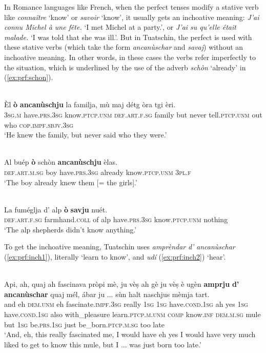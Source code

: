 In Romance languages like French, when the perfect tenses modify a stative verb like \textit{connaître} `know' or \textit{savoir} `know', it usually gets an inchoative meaning: \textit{J'ai connu Michel à une fête.} `I met Michel at a party.', or \textit{J'ai su qu'elle était malade.} `I was told that she was ill.'. But in Tuatschin, the perfect is used with these stative verbs (which take the form \textit{ancanùschar} and \textit{savaj}) without an inchoative meaning. In other words, in these cases the verbs refer imperfectly to the situation, which is underlined by the use of the adverb \textit{schòn} `already' in (\ref{ex:prf:schon}).

\ea\label{ex:prf:inch:1}
 {\citealt[139]{Büchli1966}}\\
\gll    Èl \textbf{ò} \textbf{ancanùschju} la familja, mù maj détg òra tgi èri. \\
     \textsc{3sg.m} have.\textsc{prs.3sg} know.\textsc{ptcp.unm} \textsc{def.art.f.sg} family but never tell.\textsc{ptcp.unm} out who \textsc{cop.impf.sbjv.3sg}\\
\glt `He knew the family, but never said who they were.'
\z

\ea\label{ex:prf:schon}
 {\citealt[103]{Büchli1966}}\\
\gll   Al buép \textbf{ò} schòn \textbf{ancanùschju} èlas. \\
     \textsc{def.art.m.sg} boy have.\textsc{prs.3sg} already know.\textsc{ptcp.unm} \textsc{3pl.f}\\
\glt `The boy already knew them [= the girls].'
\z

\ea\label{ex:prf:inch:2}
 {\citealt[53]{Büchli1966}}\\
\gll    La fuméglja d’ alp \textbf{ò} \textbf{savju} nuét.\\
     \textsc{def.art.f.sg} farmhand.\textsc{coll} of alp have.\textsc{prs.3sg} know.\textsc{ptcp.unm} nothing\\
\glt `The alp shepherds didn’t know anything.'
\z

To get the inchoative meaning, Tuatschin uses \textit{amprèndar} \textit{d'} \textit{ancanùschar} (\ref{ex:prf:inch1}), literally `learn to know', and \textit{udí} (\ref{ex:prf:inch2}) `hear'.

\ea
\label{ex:prf:inch1}
\\
\gll  Api, ah, quaj ah fascinava pròpi mè, ju vèṣ ah gè ju vèṣ è ugèn \textbf{amprju} \textbf{d’} \textbf{ancanùschar} quaj mél, ábar ju ... sùn halt naschjus mèmja tart. \\
and eh \textsc{dem.unm} eh fascinate.\textsc{impf.3sg} really \textsc{1sg}  \textsc{1sg} have.\textsc{cond.1sg} ah yes \textsc{1sg} have.\textsc{cond.1sg} also with\_pleasure learn.\textsc{ptcp.m.unm} \textsc{comp} know.\textsc{inf} \textsc{dem.m.sg} mule but \textsc{1sg} {} be.\textsc{prs.1sg} just be\_born.\textsc{ptcp.m.sg} too late\\
\glt `And, eh, this really fascinated me, I would have eh yes I would have very much liked to get to know this mule, but I ... was just born too late.'
\z

